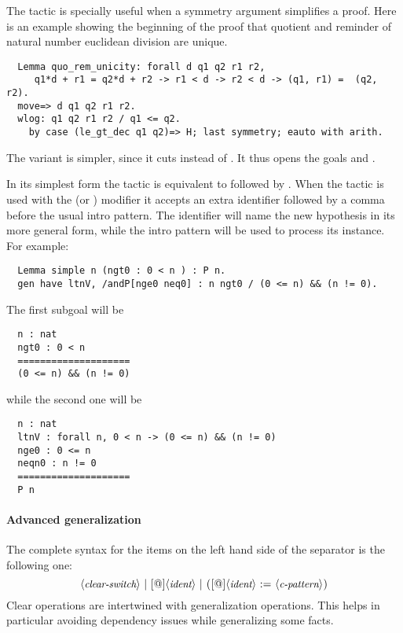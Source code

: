 The  tactic is specially useful when a symmetry argument
simplifies a proof. Here is an example showing the beginning of the
proof that quotient and reminder of natural number euclidean division
are unique.
\begin{lstlisting}
  Lemma quo_rem_unicity: forall d q1 q2 r1 r2,
     q1*d + r1 = q2*d + r2 -> r1 < d -> r2 < d -> (q1, r1) =  (q2, r2).
  move=> d q1 q2 r1 r2.
  wlog: q1 q2 r1 r2 / q1 <= q2.
    by case (le_gt_dec q1 q2)=> H; last symmetry; eauto with arith.
\end{lstlisting}

The  variant is simpler, since it cuts
 instead of . It thus
opens the goals  and .

In its simplest form
the  tactic
is equivalent to  followed by .
When the  tactic
is used with the  (or ) modifier it accepts an
extra identifier followed by a comma before the usual intro pattern.
The identifier will name the new hypothesis in its more general form,
while the intro pattern will be used to process its instance.  For example:
\begin{lstlisting}
  Lemma simple n (ngt0 : 0 < n ) : P n.
  gen have ltnV, /andP[nge0 neq0] : n ngt0 / (0 <= n) && (n != 0).
\end{lstlisting}
The first subgoal will be
\begin{lstlisting}
  n : nat
  ngt0 : 0 < n
  ====================
  (0 <= n) && (n != 0)
\end{lstlisting}
while the second one will be
\begin{lstlisting}
  n : nat
  ltnV : forall n, 0 < n -> (0 <= n) && (n != 0)
  nge0 : 0 <= n
  neqn0 : n != 0
  ====================
  P n
\end{lstlisting}

\paragraph{Advanced generalization}\label{par:advancedgen}
The complete syntax for the items on the left hand side of the \C{/}
separator is the following one:
$$
\N{clear-switch}\ |\ [\C{@}]\N{ident}\ |\ \C{(}[\C{@}]\N{ident}\ \C{:=}\ \N{c-pattern}\C{)}
$$
Clear operations are intertwined with generalization operations. This
helps in particular avoiding dependency issues while generalizing some facts.


